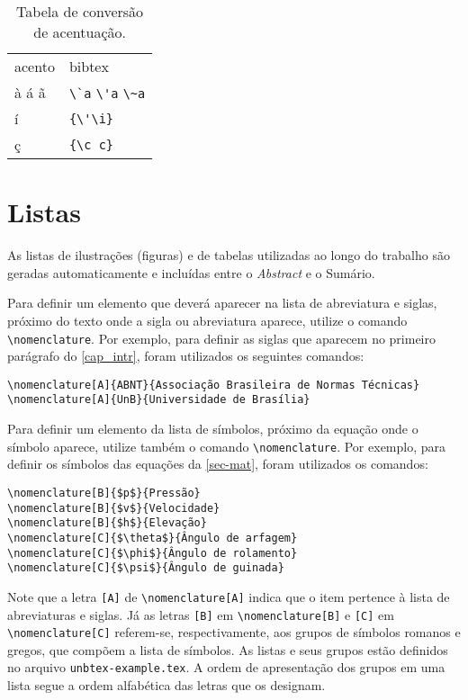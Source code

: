 \begin{table}[htbp]
\caption{Tabela de conversão de acentuação.}
\label{tabela-acentos}

\begin{center}
\begin{tabular}{ll}\hline\hline
acento & bibtex\\
à á ã & \verb+\`a+ \verb+\'a+ \verb+\~a+\\
í & \verb+{\'\i}+\\
ç & \verb+{\c c}+\\
\hline\hline
\end{tabular}
\end{center}
\end{table}

\section{Listas}

As listas de ilustrações (figuras) e de tabelas utilizadas ao longo do trabalho são geradas automaticamente e incluídas entre o \emph{Abstract} e o Sumário.

Para definir um elemento que deverá aparecer na lista de abreviatura e siglas, próximo do texto onde a sigla ou abreviatura aparece, utilize o comando \verb|\nomenclature|. Por exemplo, para definir as siglas que aparecem no primeiro parágrafo do \cref{cap_intr}, foram utilizados os seguintes comandos:

\begin{verbatim}
\nomenclature[A]{ABNT}{Associação Brasileira de Normas Técnicas}
\nomenclature[A]{UnB}{Universidade de Brasília}
\end{verbatim}

Para definir um elemento da lista de símbolos, próximo da equação onde o símbolo aparece, utilize também o comando \verb|\nomenclature|. Por exemplo, para definir os símbolos das equações da \cref{sec-mat}, foram utilizados os comandos:

\begin{verbatim}
\nomenclature[B]{$p$}{Pressão}
\nomenclature[B]{$v$}{Velocidade}
\nomenclature[B]{$h$}{Elevação}
\nomenclature[C]{$\theta$}{Ângulo de arfagem}
\nomenclature[C]{$\phi$}{Ângulo de rolamento}
\nomenclature[C]{$\psi$}{Ângulo de guinada}
\end{verbatim}

Note que a letra \verb|[A]| de \verb|\nomenclature[A]| indica que o item pertence à lista de abreviaturas e siglas. Já as letras \verb|[B]| em \verb|\nomenclature[B]| e \verb|[C]| em \verb|\nomenclature[C]| referem-se, respectivamente, aos grupos de símbolos romanos e gregos, que compõem a lista de símbolos. As listas e seus grupos estão definidos no arquivo \verb|unbtex-example.tex|. A ordem de apresentação dos grupos em uma lista segue a ordem alfabética das letras que os designam.

